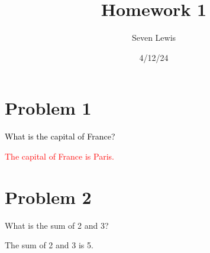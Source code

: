 \documentclass{article}
\title{Homework 1}
\author{Seven Lewis}
\date{4/12/24}
\newcommand{\problem}[1]{\textcolor{black}{#1}}
\newcommand{\solution}[1]{\textcolor{red}{#1}}
\newenvironment{Problem}
{\color{black}}
{}
\newenvironment{Solution}
{\color{red}}
{}
\begin{document}
\maketitle

\section*{Problem 1}
\problem{What is the capital of France?}

\solution{The capital of France is Paris.}

\begin{Problem}
\section*{Problem 2}
What is the sum of 2 and 3?
\end{Problem}

\begin{Solution}
The sum of 2 and 3 is 5.
\end{Solution}
\end{document}
